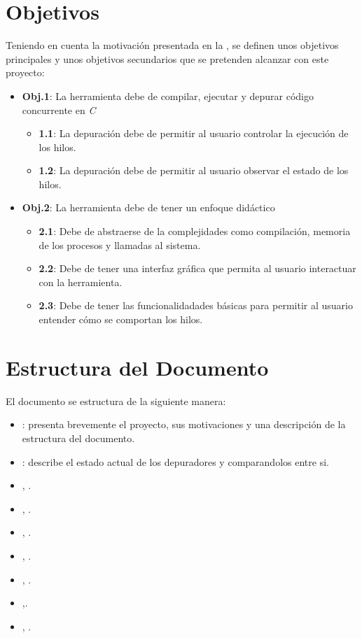 \section{Objetivos}\label{sec:objetivos}
Teniendo en cuenta la motivación presentada en la , se definen unos objetivos principales y unos objetivos secundarios que se pretenden alcanzar con este proyecto:
\begin{itemize}

    \item \textbf{Obj.1}: La herramienta debe de compilar, ejecutar y depurar código concurrente en \textit{C}
    \begin{itemize}
        \item \textbf{1.1}: La depuración debe de permitir al usuario controlar la ejecución de los hilos.
        \item \textbf{1.2}: La depuración debe de permitir al usuario observar el estado de los hilos.
    \end{itemize}
     
    \item \textbf{Obj.2}: La herramienta debe de tener un enfoque didáctico
    \begin{itemize}
        \item \textbf{2.1}: Debe de abstraerse de la complejidades como compilación, memoria de los procesos y llamadas al sistema.
        \item \textbf{2.2}: Debe de tener una \gls{interfaz gráfica} que permita al usuario interactuar con la herramienta.
        \item \textbf{2.3}: Debe de tener las funcionalidadades básicas para permitir al usuario entender cómo se comportan los hilos.
    \end{itemize}

\end{itemize}

\section{Estructura del Documento}\label{sec:estructura-documento}
El documento se estructura de la siguiente manera:
\begin{itemize}
  \item {}: presenta brevemente el proyecto, sus motivaciones y una descripción de la estructura del documento.
  \item {}: describe el estado actual de los depuradores y comparandolos entre si.
  \item {}, .
  \item {}, .
  \item {}, .
  \item {}, .
  \item {}, .
  \item {},.
  \item {}, .
\end{itemize}